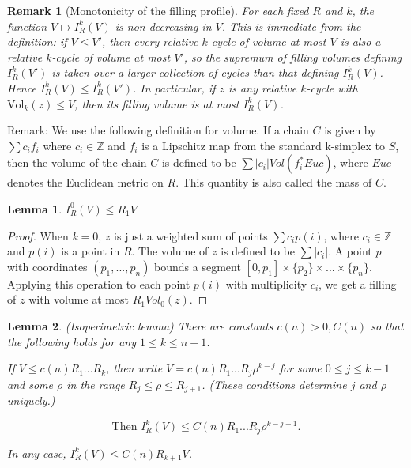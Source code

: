 \documentclass{amsart}
\newtheorem*{theorem 1}{Theorem 1}
\newtheorem*{theorem 2}{Theorem 2}
\newtheorem*{theorem 3}{Theorem 3}
\newtheorem{lemma}{Lemma}[section]
\newtheorem{remark}{Remark}
\numberwithin{equation}{section}
\newcommand{\Vol}{\textrm{Vol}}
\begin{document}
\begin{remark}[Monotonicity of the filling profile] \label{rem:monotone}
For each fixed $R$ and $k$, the function $V \mapsto I^k_R(V)$ is
non-decreasing in $V$.  This is immediate from the definition: if
$V \le V'$, then every relative $k$-cycle of volume at most $V$ is
also a relative $k$-cycle of volume at most $V'$, so the supremum
of filling volumes defining $I^k_R(V')$ is taken over a larger
collection of cycles than that defining $I^k_R(V)$.  Hence
$I^k_R(V) \le I^k_R(V')$.  In particular, if $z$ is any relative
$k$-cycle with $\Vol_k(z) \le V$, then its filling volume is at
most $I^k_R(V)$.
\end{remark}

Remark: We use the following definition for volume.  If a chain
$C$ is given by $\sum c_i f_i$ where $c_i \in \mathbb{Z}$ and
$f_i$ is a Lipschitz map from the standard k-simplex to $S$, then
the volume of the chain $C$ is defined to be $\sum |c_i|
Vol(f_i^* Euc)$, where $Euc$ denotes the Euclidean metric on $R$. 
This quantity is also called the mass of $C$.  

\begin{lemma} \label{isoperimetriclemma0}
$I_R^0(V) \le R_1 V$
\end{lemma}

\begin{proof} When $k=0$, $z$ is just a weighted sum of
points $\sum c_i p(i)$, where $c_i \in \mathbb{Z}$ and $p(i)$ is
a point in $R$.  The volume of $z$ is defined to be $\sum |c_i|$. 
A point $p$ with coordinates $(p_1, ..., p_n)$ bounds a segment
$[0, p_1] \times \{ p_2 \} \times ... \times \{ p_n \}$. 
Applying this operation to each point $p(i)$ with multiplicity
$c_i$, we get a filling of $z$ with volume at most $R_1 Vol_0(z)$.
\end{proof}


\begin{lemma} \label{isoperimetriclemma} (Isoperimetric lemma) There are constants $c(n) > 0, C(n)$ so that the
following holds for any $1 \le k \le n-1$.

If $V \le c(n) R_1 ... R_k$, then write $V = c(n) R_1 ... R_j
\rho^{k-j}$ for some $0 \le j \le k-1$ and some $\rho$ in the
range $R_j \le \rho \le R_{j+1}$. (These conditions determine $j$
and $\rho$ uniquely.)

$$\textrm{Then } I^k_R(V) \le C(n) R_1 ... R_j \rho^{k-j+1}.$$

In any case, $I^k_R(V) \le C(n) R_{k+1} V$.

\end{lemma}
\end{document}
